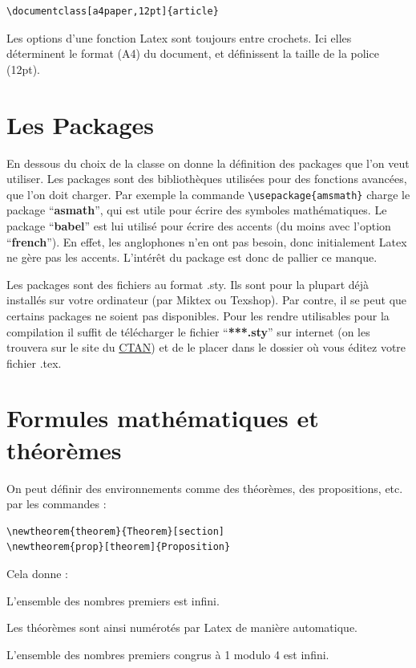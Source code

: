 \begin{lstlisting}
\documentclass[a4paper,12pt]{article}
\end{lstlisting}

Les options d'une fonction Latex sont toujours entre crochets. Ici elles déterminent le format 
(A4) du document, et définissent la taille de la police (12pt).\medskip
\section{Les Packages}

En dessous du choix de la classe on donne la définition des packages que l'on veut utiliser. 
Les packages sont des bibliothèques utilisées pour des fonctions avancées, que l'on doit charger.
 Par exemple la commande  \lstinline+\usepackage{amsmath}+ charge le package ``\textbf{asmath}'',
 qui est utile  pour écrire des symboles mathématiques. Le package ``\textbf{babel}''  est lui 
utilisé pour écrire des accents (du moins avec l'option ``\textbf{french}''). En effet, les anglophones
 n'en ont pas besoin, donc initialement Latex ne gère pas les accents. L'intérêt du package est
 donc de pallier ce manque. \medskip

Les packages sont des fichiers au format .sty. Ils sont pour la plupart déjà installés sur votre 
ordinateur (par Miktex ou Texshop). Par contre, il se peut que certains packages ne soient pas 
disponibles.  Pour les rendre utilisables pour la compilation il suffit de télécharger le fichier 
``\textbf{***.sty}''  sur internet (on les trouvera sur le site du  \href{http://www.ctan.org/}{CTAN})
  et de le placer dans le dossier où vous éditez votre fichier .tex.     \medskip

\section{Formules mathématiques et théorèmes}
On peut définir des environnements comme des théorèmes, des propositions, etc. par les commandes :\medskip
\begin{lstlisting}
\newtheorem{theorem}{Theorem}[section] 
\newtheorem{prop}[theorem]{Proposition}
\end{lstlisting}
Cela donne :

\begin{theorem}
 L'ensemble des nombres premiers est infini.
\end{theorem}
Les théorèmes  sont ainsi numérotés par Latex de manière automatique.

\begin{theorem}
 L'ensemble des nombres premiers congrus à 1 modulo 4 est infini.
\end{theorem}

